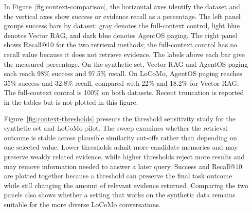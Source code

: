 In Figure~\ref{fig:context-comparison}, the horizontal axes identify the dataset and the vertical axes show success or evidence recall as a percentage. The left panel groups success bars by dataset: gray denotes the full-context control, light blue denotes Vector RAG, and dark blue denotes AgentOS paging. The right panel shows Recall@10 for the two retrieval methods; the full-context control has no recall value because it does not retrieve evidence. The labels above each bar give the measured percentage. On the synthetic set, Vector RAG and AgentOS paging each reach 98\% success and 97.5\% recall. On LoCoMo, AgentOS paging reaches 35\% success and 32.8\% recall, compared with 22\% and 18.2\% for Vector RAG. The full-context control is 100\% on both datasets. Recent truncation is reported in the tables but is not plotted in this figure.

Figure~\ref{fig:context-thresholds} presents the threshold sensitivity study for the synthetic set and LoCoMo pilot. The sweep examines whether the retrieval outcome is stable across plausible similarity cut-offs rather than depending on one selected value. Lower thresholds admit more candidate memories and may preserve weakly related evidence, while higher thresholds reject more results and may remove information needed to answer a later query. Success and Recall@10 are plotted together because a threshold can preserve the final task outcome while still changing the amount of relevant evidence returned. Comparing the two panels also shows whether a setting that works on the synthetic data remains suitable for the more diverse LoCoMo conversations.

